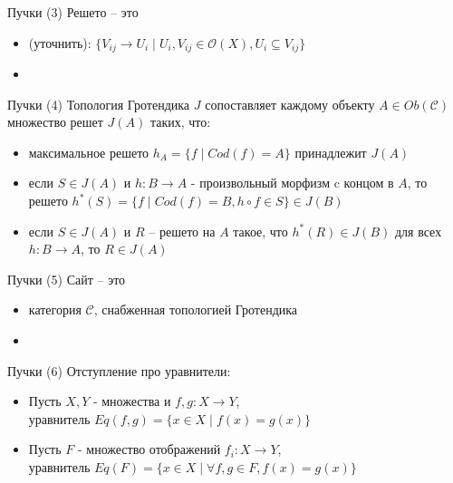 \documentclass{beamer}
\begin{document}
\begin{frame}{Пучки (3)}
Решето -- это\\
\medskip
\begin{small}
\begin{itemize}
	\item (уточнить): $\{ V_{ij} \to U_i \; \vert \; U_i, V_{ij} \in \mathcal{O}(X), U_i \subseteq V_{ij} \}$
	\item 
\end{itemize}
\end{small}
\end{frame}

\begin{frame}{Пучки (4)}
Топология Гротендика $J$ сопоставляет каждому объекту $A \in Ob(\mathcal{C})$ множество решет $J(A)$ таких, что:\\
\medskip
\begin{small}
\begin{itemize}
	\item максимальное решето $h_A = \{ f \; \vert \; Cod(f) = A \}$ принадлежит $J(A)$
	\item если $S \in J(A)$ и $h : B \to A$ - произвольный морфизм c концом в $A$, то решето $h^*(S) = \{ f \; \vert \; Cod(f) = B, h \circ f \in S \} \in J(B)$
	\item если $S \in J(A)$ и $R$ -- решето на $A$ такое, что $h^*(R) \in J(B)$ для всех $h : B \to A$, то $R \in J(A)$
\end{itemize}
\end{small}
\end{frame}

\begin{frame}{Пучки (5)}
Сайт -- это\\
\medskip
\begin{small}
\begin{itemize}
	\item категория $\mathcal{C}$, снабженная топологией Гротендика
	\item 
\end{itemize}
\end{small}
\end{frame}

\begin{frame}{Пучки (6)}
Отступление про уравнители:\\
\medskip
\begin{small}
\begin{itemize}
	\item Пусть $X, Y$ - множества и $f, g : X \to Y$, \\уравнитель $Eq(f,g) = \{ x \in X \; \vert \; f(x) = g(x) \}$
	\medskip
	\item Пусть $F$ - множество отображений $f_i : X \to Y$, \\уравнитель $Eq(F) = \{ x \in X \; \vert \; \forall f, g \in F, f(x) = g(x) \}$
\end{itemize}
\end{small}
\end{frame}
\end{document}
